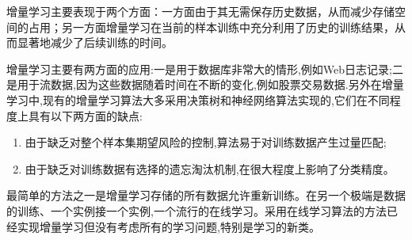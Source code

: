 增量学习主要表现于两个方面：一方面由于其无需保存历史数据，从而减少存储空间的占用；另一方面增量学习在当前的样本训练中充分利用了历史的训练结果，从而显著地减少了后续训练的时间。

增量学习主要有两方面的应用:一是用于数据库非常大的情形,例如Web日志记录;二是用于流数据,因为这些数据随着时间在不断的变化,例如股票交易数据.另外在增量学习中,现有的增量学习算法大多采用决策树和神经网络算法实现的,它们在不同程度上具有以下两方面的缺点:
\begin{enumerate}
    \item 由于缺乏对整个样本集期望风险的控制,算法易于对训练数据产生过量匹配;
    \item 由于缺乏对训练数据有选择的遗忘淘汰机制,在很大程度上影响了分类精度。
\end{enumerate}

最简单的方法之一是增量学习存储的所有数据允许重新训练。在另一个极端是数据的训练、一个实例接一个实例,一个流行的在线学习。采用在线学习算法的方法已经实现增量学习但没有考虑所有的学习问题,特别是学习的新类。



